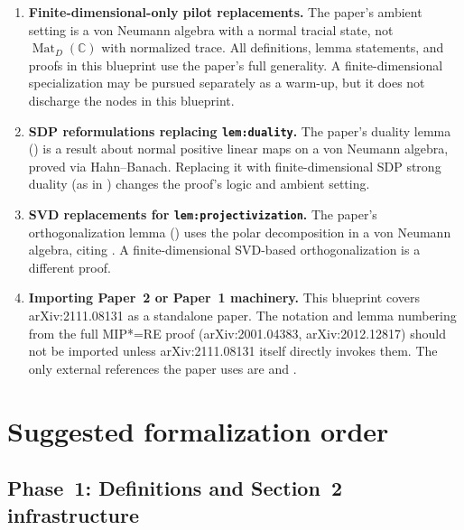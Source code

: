 \documentclass{article}
\theoremstyle{remark}
\newcommand{\C}{\mathbb{C}}
\newcommand{\Mat}{\operatorname{Mat}}
\begin{document}
\begin{enumerate}
	\item \textbf{Finite-dimensional-only pilot replacements.}
	      The paper's ambient setting is a von Neumann algebra with a normal tracial
	      state, not $\Mat_D(\C)$ with normalized trace.
	      All definitions, lemma statements, and proofs in this blueprint use the
	      paper's full generality. A finite-dimensional specialization may be pursued
	      separately as a warm-up, but it does not discharge the nodes in this blueprint.

	\item \textbf{SDP reformulations replacing \texttt{lem:duality}.}
	      The paper's duality lemma () is a result about normal
	      positive linear maps on a von Neumann algebra, proved via Hahn--Banach.
	      Replacing it with finite-dimensional SDP strong duality (as in
	      \cite[Lemma~10]{natarajan2018two}) changes the proof's logic and ambient
	      setting.

	\item \textbf{SVD replacements for \texttt{lem:projectivization}.}
	      The paper's orthogonalization lemma () uses the
	      polar decomposition in a von Neumann algebra, citing
	      \cite{de2021orthogonalization}.
	      A finite-dimensional SVD-based orthogonalization is a different proof.

	\item \textbf{Importing Paper~2 or Paper~1 machinery.}
	      This blueprint covers arXiv:2111.08131 as a standalone paper.
	      The notation and lemma numbering from the full MIP*=RE proof
	      (arXiv:2001.04383, arXiv:2012.12817) should not be imported unless
	      arXiv:2111.08131 itself directly invokes them.
	      The only external references the paper uses are
	      \cite{de2021orthogonalization} and \cite{vidick2021almost}.
\end{enumerate}

\section{Suggested formalization order}
\label{sec:order}

\subsection{Phase~1: Definitions and Section~2 infrastructure}
\end{document}
